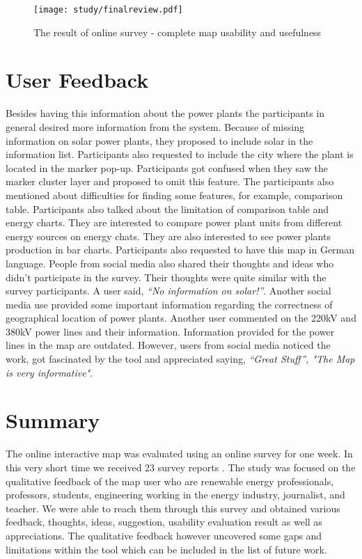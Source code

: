 \begin{figure} 
  \begin{center}
    \texttt{[image: study/finalreview.pdf]}
    \caption{The result of online survey - complete map usability and usefulness}
    \label{fig:finalRev}
  \end{center}
\end{figure}

\section{User Feedback}

Besides having this information about the power plants the participants in general desired more information from the system. Because of missing information on solar power plants, they proposed to include solar in the information list. Participants also requested to include the city where the plant is located in the marker pop-up. Participants got confused when they saw the marker cluster layer and proposed to omit this feature. The participants also mentioned about difficulties for finding some features, for example, comparison table. Participants also talked about the limitation of comparison table and energy charts. They are interested to compare power plant units from different energy sources on energy chats. They are also interested to see power plants production in bar charts. Participants also requested to have this map in German language. People from social media also shared their thoughts and ideas who didn't participate in the survey. Their thoughts were quite similar with the survey participants. A user said, \textit{“No information on solar!”}. Another social media use provided some important information regarding the correctness of geographical location of power plants.   Another user commented on the 220kV and 380kV power lines and their information. Information provided for the power lines in the map are outdated. However, users from social media noticed the work, got fascinated by the tool and appreciated saying, \textit{“Great Stuff”, "The Map is very informative"}.  

\section{Summary}

The online interactive map was evaluated using an online survey for one week. In this very short time we received 23 survey reports . The study was focused on the qualitative feedback of the map user who are renewable energy professionals, professors, students, engineering working in the energy industry, journalist, and teacher. We were able to reach them through this survey and obtained various feedback, thoughts, ideas, suggestion, usability evaluation result as well as appreciations. The qualitative feedback however uncovered some gaps and limitations within the tool which can be included in the list of future work.
